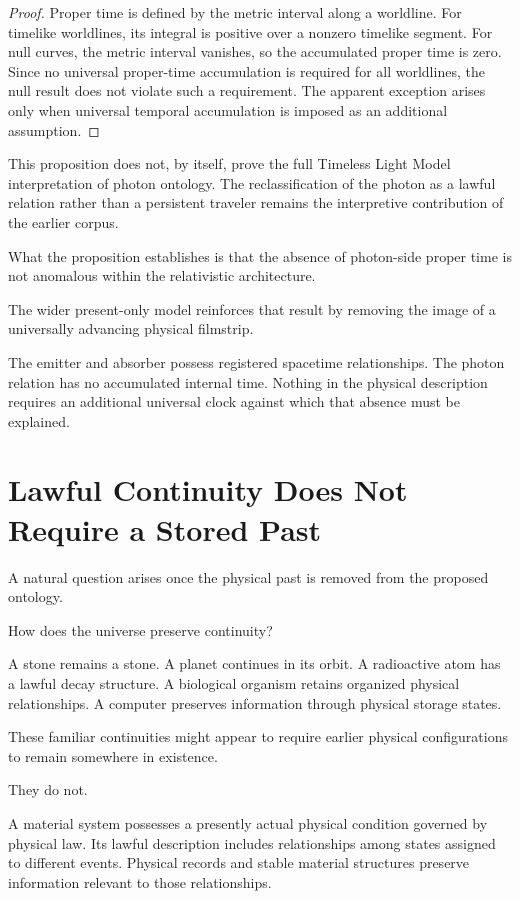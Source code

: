 \documentclass[12pt,onecolumn]{article}
\begin{document}
\begin{proof}

Proper time is defined by the metric interval along a worldline. For timelike worldlines, its integral is positive over a nonzero timelike segment. For null curves, the metric interval vanishes, so the accumulated proper time is zero. Since no universal proper-time accumulation is required for all worldlines, the null result does not violate such a requirement. The apparent exception arises only when universal temporal accumulation is imposed as an additional assumption.

\end{proof}

This proposition does not, by itself, prove the full Timeless Light Model interpretation of photon ontology. The reclassification of the photon as a lawful relation rather than a persistent traveler remains the interpretive contribution of the earlier corpus.

What the proposition establishes is that the absence of photon-side proper time is not anomalous within the relativistic architecture.

The wider present-only model reinforces that result by removing the image of a universally advancing physical filmstrip.

The emitter and absorber possess registered spacetime relationships. The photon relation has no accumulated internal time. Nothing in the physical description requires an additional universal clock against which that absence must be explained.

\section{Lawful Continuity Does Not Require a Stored Past}

A natural question arises once the physical past is removed from the proposed ontology.

How does the universe preserve continuity?

A stone remains a stone. A planet continues in its orbit. A radioactive atom has a lawful decay structure. A biological organism retains organized physical relationships. A computer preserves information through physical storage states.

These familiar continuities might appear to require earlier physical configurations to remain somewhere in existence.

They do not.

A material system possesses a presently actual physical condition governed by physical law. Its lawful description includes relationships among states assigned to different events. Physical records and stable material structures preserve information relevant to those relationships.
\end{document}
